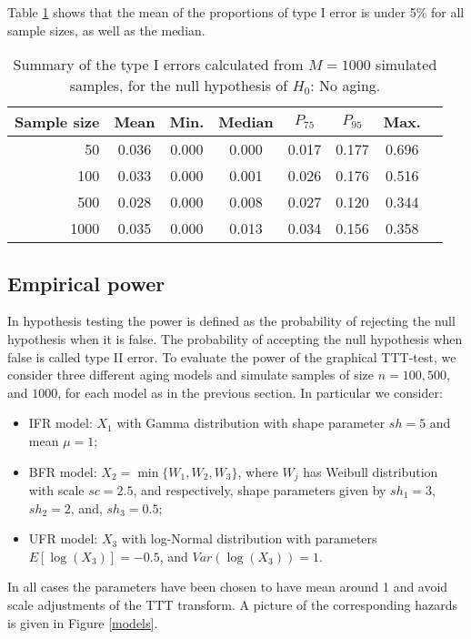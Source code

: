 \documentclass[preprint,12pt]{elsarticle}
\begin{document}
Table \ref{Tab:errorI}  shows that the mean of the proportions of type  I error is under 5\% for all sample sizes, as well as the median. 

\begin{table}[htb]
\centering
\caption{Summary of the type I errors calculated from $M=1000$ simulated samples, for the null hypothesis of $ H_0$: No aging.}
{\begin{tabular}{r|ccccccc}
   Sample size & Mean &   Min.     & Median & $P_{75}$ & $P_{95}$& Max. \\ \hline
      50     & 0.036 & 0.000 & 0.000 & 0.017 &0.177 &0.696 \\
     100     & 0.033 & 0.000 & 0.001 & 0.026 &0.176 &0.516 \\
     500     & 0.028 & 0.000 & 0.008 & 0.027 &0.120 &0.344\\
     1000    & 0.035 & 0.000 & 0.013 & 0.034 &0.156 &0.358\\ \hline
\end{tabular}}
\label{Tab:errorI}
\end{table}

\subsection{Empirical power}

In hypothesis testing the power is defined as the probability of rejecting the null hypothesis when it is false. The probability of accepting the null hypothesis when false is called type II error. To evaluate the power of the graphical TTT-test, we consider three  different aging models and  simulate samples of size $n = 100, 500$, and $1000$, for each model as in the previous section.  In particular we consider:
\begin{itemize}
\item IFR model: $X_1$ with Gamma distribution with shape parameter $sh=5$ and mean $\mu=1$;
\item BFR model: $X_2= \min\{W_1, W_2, W_3\}$, where $W_j$ has Weibull distribution with scale $sc=2.5$, and respectively, shape parameters given by $sh_1=3$, $sh_2=2$, and, $sh_3=0.5$;
\item UFR model: $X_3$ with log-Normal distribution with parameters $E[ \log (X_3)]=-0.5$, and $Var(\log(X_3))=1$.
\end{itemize}
In all cases the parameters have been chosen to have mean around 1 and avoid scale adjustments of the TTT transform. A picture of the corresponding hazards is given in Figure \ref{models}.
\end{document}
